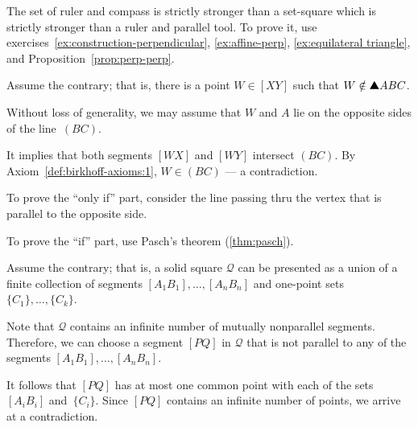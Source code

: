 The set of ruler and compass is strictly stronger than a set-square which is strictly stronger than a ruler and parallel tool.
To prove it, use exercises~\ref{ex:construction-perpendicular},
\ref{ex:affine-perp},
\ref{ex:equilateral triangle},
and Proposition~\ref{prop:perp-perp}.

\setcounter{eqtn}{0} 

Assume the contrary; 
that is, there is a point $W\in [XY]$ such that $W\notin\solidtriangle ABC$.



Without loss of generality, we may assume that $W$ and $A$ lie on the opposite sides of the line~$(BC)$.

It implies that both segments $[WX]$ and $[WY]$ intersect $(BC)$.
By Axiom~\ref{def:birkhoff-axioms:1}, $W\in (BC)$ --- a contradiction.


To prove the ``only if'' part, consider the line passing thru the vertex that is parallel to the opposite side.

To prove the ``if'' part, use Pasch's theorem (\ref{thm:pasch}).

Assume the contrary; that is, a solid square $\mathcal{Q}$ can be presented as a union of a finite collection of segments $[A_1B_1],\dots,[A_nB_n]$
and one-point sets $\{C_1\},\dots,\{C_k\}$.

Note that $\mathcal{Q}$ contains an infinite number of mutually nonparallel segments.
Therefore, we can choose a segment $[PQ]$ in $\mathcal{Q}$ 
that is not parallel to any of the segments $[A_1B_1],\dots,[A_nB_n]$.

It follows that $[PQ]$ has at most one common point with each of the sets $[A_iB_i]$ and~$\{C_i\}$.
Since $[PQ]$ contains an infinite number of points, we arrive at a contradiction.

